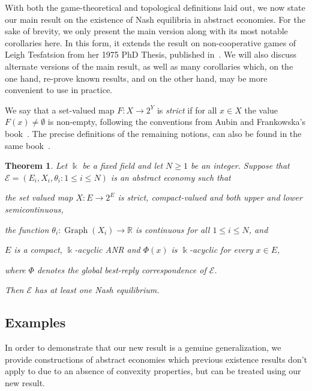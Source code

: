 \documentclass[a4paper,11pt,reqno,english]{amsart}
\newtheorem{theorem}{Theorem}[section]
\theoremstyle{definition}
\begin{document}
\medskip
With both the game-theoretical and topological definitions laid out, we now state our main result on the existence of Nash equilibria in abstract economies.
For the sake of brevity, we only present the main version along with its most notable corollaries here.
In this form, it extends the result on non-cooperative games of Leigh Tesfatsion from her 1975 PhD Thesis, published in~\cite{Tesfatsion1983}.
We will also discuss alternate versions of the main result, as well as many corollaries which, on the one hand, re-prove known results, and on the other hand, may be more convenient to use in practice.

We say that a set-valued map $F\colon X\longrightarrow 2^Y$ is \textit{strict} if for all $x\in X$ the value $F(x)\neq\emptyset$ is non-empty, following the conventions from Aubin and Frankowska's book~\cite{Aubin_Frankowska_2009}. The precise definitions of the remaining notions, can also be found in the same book~\cite[Chap.\,1.3,\,1.4]{Aubin_Frankowska_2009}.
\begin{theorem}\label{thm:MainResult}
	Let $\Bbbk$ be a fixed field and let $N\geq 1$ be an integer. Suppose that $\mathcal{E}=(E_i, X_i, \theta_i\colon 1\leq i \leq N)$ is an abstract economy such that
	\begin{compactenum}[\rm \quad (1)]
		\item the set valued map $X\colon E\longrightarrow 2^{E}$ is strict, compact-valued and both upper and lower semicontinuous,
		\item the function $\theta_i\colon\operatorname{Graph}(X_i)\longrightarrow\mathbb{R}$ is continuous for all $1\leq i \leq N$, and
		\item $E$ is a compact, $\Bbbk$-acyclic ANR and $\Phi(x)$ is $\Bbbk$-acyclic for every $x\in E$,
	\end{compactenum}
	where $\Phi$ denotes the global best-reply correspondence of $\mathcal{E}$.

	\noindent Then $\mathcal{E}$ has at least one Nash equilibrium.
\end{theorem}

\subsection{Examples}

In order to demonstrate that our new result is a genuine generalization, we provide constructions of abstract economies which previous existence results don't apply to due to an absence of convexity properties, but can be treated using our new result.
\end{document}
